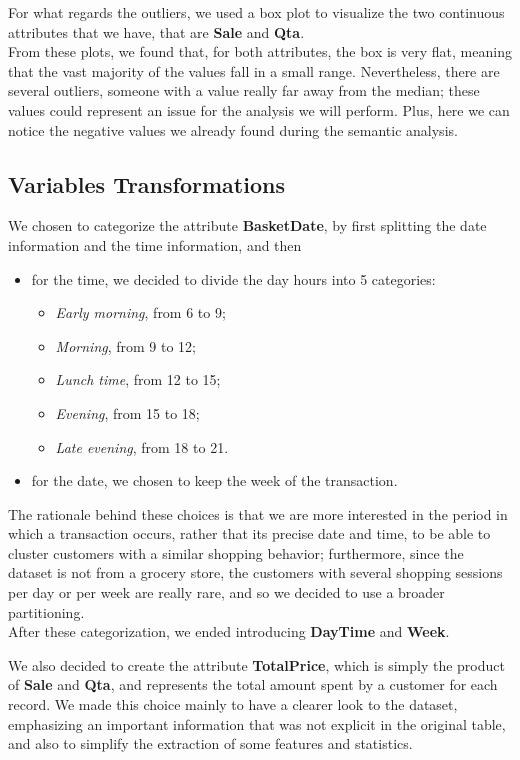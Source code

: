 For what regards the outliers, we used a box plot to visualize the two continuous attributes that we have, that are \textbf{Sale} and \textbf{Qta}.\\
From these plots, we found that, for both attributes, the box is very flat, meaning that the vast majority of the values fall in a small range. Nevertheless, there are several outliers, someone with a value really far away from the median; these values could represent an issue for the analysis we will perform. Plus, here we can notice the negative values we already found during the semantic analysis.

\subsection{Variables Transformations}
We chosen to categorize the attribute \textbf{BasketDate}, by first splitting the date information and the time information, and then

\begin{itemize}
\item for the time, we decided to divide the day hours into 5 categories:
	\begin{itemize}
	\item \emph{Early morning}, from 6 to 9;
	\item \emph{Morning}, from 9 to 12;
	\item \emph{Lunch time}, from 12 to 15;
	\item \emph{Evening}, from 15 to 18;
	\item \emph{Late evening}, from 18 to 21.
	\end{itemize}
\item for the date, we chosen to keep the week of the transaction.
\end{itemize}

The rationale behind these choices is that we are more interested in the period in which a transaction occurs, rather that its precise date and time, to be able to cluster customers with a similar shopping behavior; furthermore, since the dataset is not from a grocery store, the customers with several shopping sessions per day or per week are really rare, and so we decided to use a broader partitioning.\\
After these categorization, we ended introducing \textbf{DayTime} and \textbf{Week}.

We also decided to create the attribute \textbf{TotalPrice}, which is simply the product of \textbf{Sale} and \textbf{Qta}, and represents the total amount spent by a customer for each record. We made this choice mainly to have a clearer look to the dataset, emphasizing an important information that was not explicit in the original table, and also to simplify the extraction of some features and statistics.

